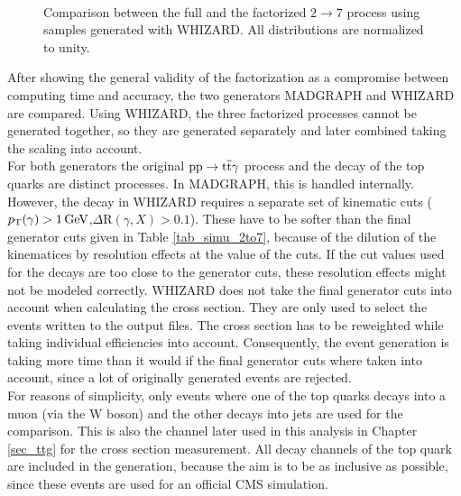 \begin{figure}[ht]
\centering
  \\
  \caption{Comparison between the full and the factorized $2 \to 7$ process using samples generated with WHIZARD. All distributions are normalized to unity.}
  \label{fig_simu_whiz}
\end{figure}


After showing the general validity of the factorization as a compromise between computing time and accuracy, the two generators MADGRAPH and WHIZARD are compared. Using WHIZARD, the three factorized processes cannot be generated together, so they are generated separately and later combined taking the scaling into account.\\
For both generators the original $ \mathrm{pp} \to \mathrm{t}\overline{\mathrm{t}} \gamma$ process and the decay of the top quarks are distinct processes. In MADGRAPH, this is handled internally. However, the decay in WHIZARD requires a separate set of kinematic cuts ($p_{\mathrm{T}} (\gamma) > \SI{1}{\giga \electronvolt}$,$\Delta \mathrm{R}(\gamma,X) > 0.1$). These have to be softer than the final generator cuts given in Table \ref{tab_simu_2to7}, because of the dilution of the kinematices by resolution effects at the value of the cuts. If the cut values used for the decays are too close to the generator cuts, these resolution effects might not be modeled correctly. WHIZARD does not take the final generator cuts into account when calculating the cross section. They are only used to select the events written to the output files. The cross section has to be reweighted while taking individual efficiencies into account. Consequently, the event generation is taking more time than it would if the final generator cuts where taken into account, since a lot of originally generated events are rejected. \\
For reasons of simplicity, only events where one of the top quarks decays into a muon (via the W boson) and the other decays into jets are used for the comparison. This is also the channel later used in this analysis in Chapter \ref{sec_ttg} for the cross section measurement. All decay channels of the top quark are included in the generation, because the aim is to be as inclusive as possible, since these \ttgamma events are used for an official CMS simulation.\\
\FloatBarrier

